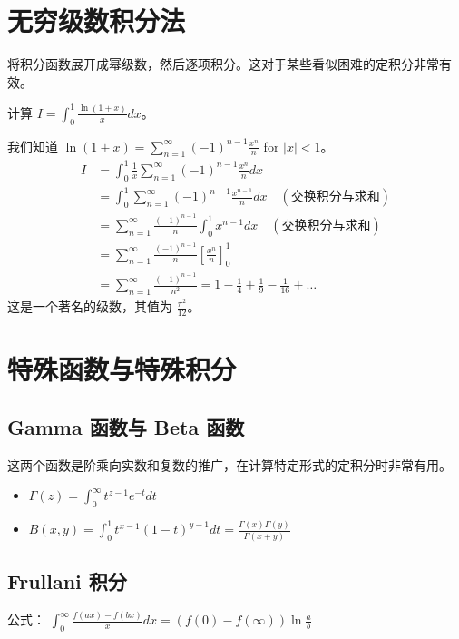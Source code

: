 \documentclass[lang=cn,newtx,10pt,scheme=chinese]{elegantbook}
\begin{document}
\section{无穷级数积分法}
将积分函数展开成幂级数，然后逐项积分。这对于某些看似困难的定积分非常有效。
\begin{problem}
    计算 $I = \int_0^1 \frac{\ln(1+x)}{x} dx$。
\end{problem}
\begin{solution}
    我们知道 $\ln(1+x) = \sum_{n=1}^\infty (-1)^{n-1} \frac{x^n}{n}$ for $|x|<1$。
    \begin{align*}
        I &= \int_0^1 \frac{1}{x} \sum_{n=1}^\infty (-1)^{n-1} \frac{x^n}{n} dx \\
        &= \int_0^1 \sum_{n=1}^\infty (-1)^{n-1} \frac{x^{n-1}}{n} dx \quad (\text{交换积分与求和}) \\
        &= \sum_{n=1}^\infty \frac{(-1)^{n-1}}{n} \int_0^1 x^{n-1} dx \quad (\text{交换积分与求和}) \\
        &= \sum_{n=1}^\infty \frac{(-1)^{n-1}}{n} \left[ \frac{x^n}{n} \right]_0^1 \\
        &= \sum_{n=1}^\infty \frac{(-1)^{n-1}}{n^2} = 1 - \frac{1}{4} + \frac{1}{9} - \frac{1}{16} + \dots
    \end{align*}
    这是一个著名的级数，其值为 $\frac{\pi^2}{12}$。
\end{solution}

\section{特殊函数与特殊积分}
\subsection{Gamma 函数与 Beta 函数}
这两个函数是阶乘向实数和复数的推广，在计算特定形式的定积分时非常有用。
\begin{itemize}
    \item $\Gamma(z) = \int_0^\infty t^{z-1}e^{-t} dt$
    \item $B(x, y) = \int_0^1 t^{x-1}(1-t)^{y-1} dt = \frac{\Gamma(x)\Gamma(y)}{\Gamma(x+y)}$
\end{itemize}

\subsection{Frullani 积分}
公式： $\int_0^\infty \frac{f(ax) - f(bx)}{x} dx = (f(0) - f(\infty)) \ln\frac{a}{b}$
\end{document}
